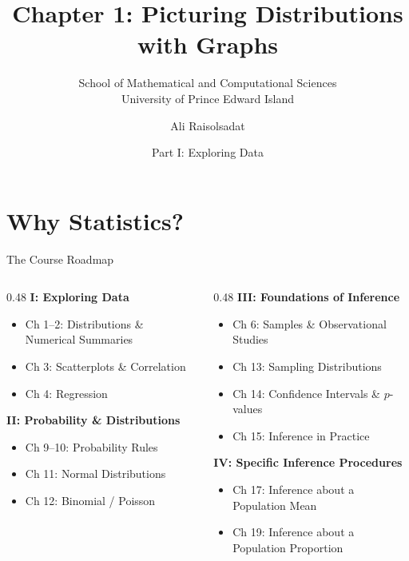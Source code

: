 \documentclass[aspectratio=169]{beamer}
\title[Chapter 1: Picturing Distributions]{\textbf{Chapter 1: Picturing Distributions with Graphs}}
\subtitle{School of Mathematical and Computational Sciences \\ University of Prince Edward Island}
\author{Ali Raisolsadat}
\date{Part I: Exploring Data}
\begin{document}
\section{Why Statistics?}

\begin{frame}
  \titlepage
\end{frame}

\begin{frame}{The Course Roadmap}
  \begin{columns}[T]
    \begin{column}{0.48\textwidth}
      \textbf{I: Exploring Data}
      \begin{itemize}
        \item Ch 1--2: Distributions \& Numerical Summaries
        \item Ch 3: Scatterplots \& Correlation
        \item Ch 4: Regression
      \end{itemize}
      \vspace{0.1cm}
      \textbf{II: Probability \& Distributions}
      \begin{itemize}
        \item Ch 9--10: Probability Rules
        \item Ch 11: Normal Distributions
        \item Ch 12: Binomial / Poisson
      \end{itemize}
    \end{column}
    \begin{column}{0.48\textwidth}
      \textbf{III: Foundations of Inference}
      \begin{itemize}
       \item Ch 6: Samples \& Observational Studies
        \item Ch 13: Sampling Distributions
        \item Ch 14: Confidence Intervals \& $p$-values
        \item Ch 15: Inference in Practice
      \end{itemize}
      \vspace{0.1cm}
      \textbf{IV: Specific Inference Procedures}
      \begin{itemize}
        \item Ch 17: Inference about a Population Mean
        \item Ch 19: Inference about a Population Proportion
      \end{itemize}
    \end{column}
  \end{columns}
\end{frame}
\end{document}
